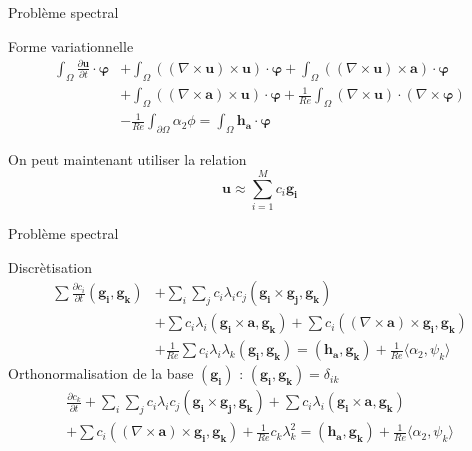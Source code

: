 \documentclass{beamer}
\newcommand{\rot}{{\nabla\times}}
\begin{document}
\begin{frame}{Problème spectral}
\begin{block}{Forme variationnelle}
\begin{align*}
\int_\Omega \frac{\partial \mathbf{u}}{\partial t}\cdot \bm{\varphi} &+ \int_\Omega ((\rot \mathbf{u})\times \mathbf{u})\cdot \bm{\varphi} + \int_\Omega ((\rot \mathbf{u})\times \mathbf{a})\cdot\bm{\varphi} \\
&+ \int_\Omega ((\rot \mathbf{a})\times \mathbf{u})\cdot\bm{\varphi} + \frac{1}{Re}\int_\Omega (\rot \mathbf{u})\cdot(\rot\bm{\varphi}) \\
&-\frac{1}{Re}\int_{\partial\Omega} \alpha_2\phi = \int_\Omega \mathbf{h_a}\cdot\bm{\varphi}
\end{align*}
\end{block}
On peut maintenant utiliser la relation 
\[
\mathbf{u}\approx\sum_{i=1}^M c_i\mathbf{g_i}
\]
\end{frame}

\begin{frame}{Problème spectral}
\begin{block}{Discrètisation}
\begin{align*}
\sum \frac{\partial c_i}{\partial t}(\mathbf{g_i},\mathbf{g_k}) &+ \sum_i\sum_j c_i\lambda_i c_j(\mathbf{g_i}\times \mathbf{g_j}, \mathbf{g_k}) \\
&+ \sum c_i\lambda_i(\mathbf{g_i}\times \mathbf{a},\mathbf{g_k}) + \sum c_i((\rot \mathbf{a})\times \mathbf{g_i}, \mathbf{g_k}) \\
&+ \frac{1}{Re}\sum c_i\lambda_i\lambda_k(\mathbf{g_i},\mathbf{g_k}) = (\mathbf{h_a},\mathbf{g_k}) + \frac{1}{Re}\langle\alpha_2,\psi_k\rangle
\end{align*}
Orthonormalisation de la base $(\mathbf{g_i})$ : $(\mathbf{g_i},\mathbf{g_k})=\delta_{ik}$
\begin{eqnarray*}
\frac{\partial c_k}{\partial t} + \sum_i\sum_j c_i\lambda_i c_j(\mathbf{g_i}\times \mathbf{g_j}, \mathbf{g_k}) + \sum c_i\lambda_i(\mathbf{g_i}\times \mathbf{a},\mathbf{g_k})\\
+ \sum c_i((\rot \mathbf{a})\times \mathbf{g_i}, \mathbf{g_k}) + \frac{1}{Re}c_k\lambda_k^2 = (\mathbf{h_a},\mathbf{g_k}) + \frac{1}{Re}\langle\alpha_2,\psi_k\rangle
\end{eqnarray*}
\end{block}
\end{frame}
\end{document}
